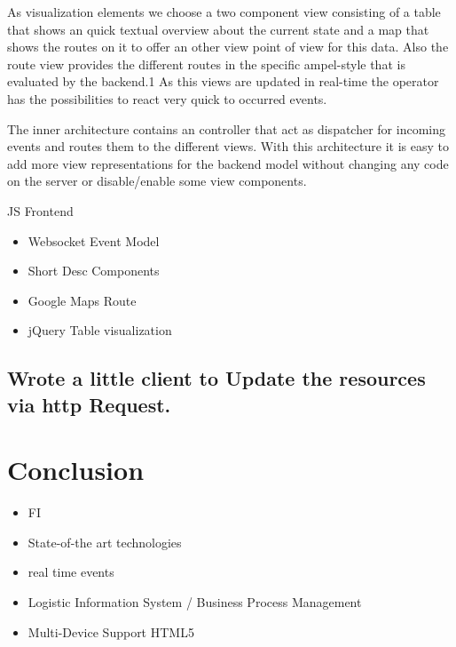 \documentclass{acm_proc_article-sp}
\begin{document}
As visualization elements we choose a two component view consisting of a table that shows an quick textual overview about the current state and a map that shows the routes on it to offer an other view point of view for this data. Also the route view provides the different routes in the specific ampel-style that is evaluated by the backend.1
As this views are updated in real-time the operator has the possibilities to react very quick to occurred events.

The inner architecture contains an controller that act as dispatcher for incoming events and routes them to the different views. With this architecture it is easy to add more view representations for the backend model without changing any code on the server or disable/enable some view components.

JS Frontend
		\begin{itemize}
			\item Websocket Event Model
			\item Short Desc Components
			\item Google Maps Route
			\item jQuery Table visualization
		\end{itemize}
		
		
\subsection{Wrote a little client to Update the resources via http Request.}


\section{Conclusion}
\label{sec:Conclusion}
\begin{itemize}
	\item FI
	\item State-of-the art technologies
	\item real time events
	\item Logistic Information System / Business Process Management
	\item Multi-Device Support HTML5
\end{itemize}

%

%
%
\appendix
\end{document}
